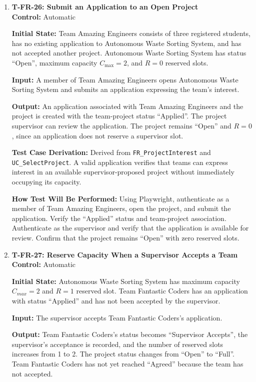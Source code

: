 \documentclass[12pt, titlepage]{article}
\begin{document}
\begin{enumerate}
\item \label{T-FR-26}\textbf{T-FR-26: Submit an Application to an Open Project}\\

\textbf{Control:} Automatic

\textbf{Initial State:} Team Amazing Engineers consists of three registered students, has no existing application to Autonomous Waste Sorting System, and has not accepted another project. Autonomous Waste Sorting System has status ``Open'', maximum capacity $C_{\max}=2$, and $R=0$ reserved slots.

\textbf{Input:} A member of Team Amazing Engineers opens Autonomous Waste Sorting System and submits an application expressing the team's interest.

\textbf{Output:} An application associated with Team Amazing Engineers and the project is created with the team-project status ``Applied''. The project supervisor can review the application. The project remains ``Open'' and $R=0$, since an application does not reserve a supervisor slot.

\textbf{Test Case Derivation:} Derived from \texttt{FR\_ProjectInterest} and \texttt{UC\_SelectProject}. A valid application verifies that teams can express interest in an available supervisor-proposed project without immediately occupying its capacity.

\textbf{How Test Will Be Performed:} Using Playwright, authenticate as a member of Team Amazing Engineers, open the project, and submit the application. Verify the ``Applied'' status and team-project association. Authenticate as the supervisor and verify that the application is available for review. Confirm that the project remains ``Open'' with zero reserved slots.

\item \label{T-FR-27}\textbf{T-FR-27: Reserve Capacity When a Supervisor Accepts a Team}\\

\textbf{Control:} Automatic

\textbf{Initial State:} Autonomous Waste Sorting System has maximum capacity $C_{max}=2$ and $R=1$ reserved slot. Team Fantastic Coders has an application with status ``Applied'' and has not been accepted by the supervisor.

\textbf{Input:} The supervisor accepts Team Fantastic Coders's application.

\textbf{Output:} Team Fantastic Coders's status becomes ``Supervisor Accepts'', the supervisor's acceptance is recorded, and the number of reserved slots increases from 1 to 2. The project status changes from ``Open'' to ``Full''. Team Fantastic Coders has not yet reached ``Agreed'' because the team has not accepted.


\end{enumerate}
\end{document}
